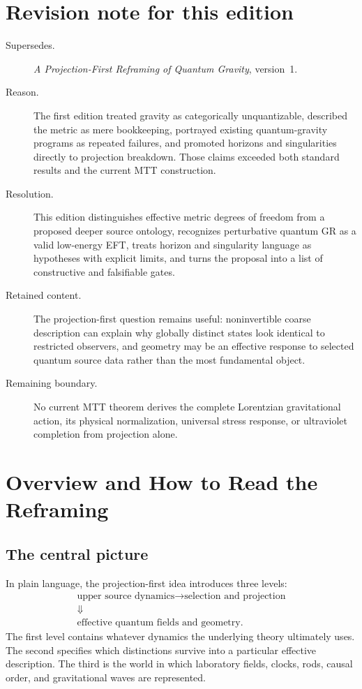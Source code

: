 \documentclass[11pt]{article}
\begin{document}
\section*{Revision note for this edition}
\begin{description}
\item[Supersedes.] \emph{A Projection-First Reframing of Quantum Gravity},
version~1.
\item[Reason.] The first edition treated gravity as categorically
unquantizable, described the metric as mere bookkeeping, portrayed existing
quantum-gravity programs as repeated failures, and promoted horizons and
singularities directly to projection breakdown.  Those claims exceeded both
standard results and the current MTT construction.
\item[Resolution.] This edition distinguishes effective metric degrees of
freedom from a proposed deeper source ontology, recognizes perturbative
quantum GR as a valid low-energy EFT, treats horizon and singularity language
as hypotheses with explicit limits, and turns the proposal into a list of
constructive and falsifiable gates.
\item[Retained content.] The projection-first question remains useful:
noninvertible coarse description can explain why globally distinct states
look identical to restricted observers, and geometry may be an effective
response to selected quantum source data rather than the most fundamental
object.
\item[Remaining boundary.] No current MTT theorem derives the complete
Lorentzian gravitational action, its physical normalization, universal
stress response, or ultraviolet completion from projection alone.
\end{description}

\tableofcontents

\section{Overview and How to Read the Reframing}

\subsection{The central picture}

In plain language, the projection-first idea introduces three levels:
\[
\begin{gathered}
\boxed{\text{upper source dynamics}}
\longrightarrow
\boxed{\text{selection and projection}}
\\[1mm]
\Downarrow
\\[-1mm]
\boxed{\text{effective quantum fields and geometry}} .
\end{gathered}
\]
The first level contains whatever dynamics the underlying theory ultimately
uses.  The second specifies which distinctions survive into a particular
effective description.  The third is the world in which laboratory fields,
clocks, rods, causal order, and gravitational waves are represented.
\end{document}
